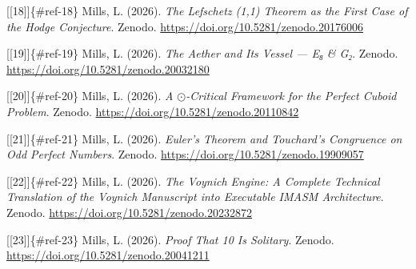 \documentclass[10pt,a4paper]{article}
\begin{document}
{[}{[}18{]}{]}\{\#ref-18\} Mills, L. (2026). \emph{The Lefschetz (1,1) Theorem as the First Case of the Hodge Conjecture}. Zenodo. \href{}{https://doi.org/10.5281/zenodo.20176006}

{[}{[}19{]}{]}\{\#ref-19\} Mills, L. (2026). \emph{The Aether and Its Vessel --- E₈ \& G₂}. Zenodo. \href{}{https://doi.org/10.5281/zenodo.20032180}

{[}{[}20{]}{]}\{\#ref-20\} Mills, L. (2026). \emph{A $\odot$-Critical Framework for the Perfect Cuboid Problem}. Zenodo. \href{}{https://doi.org/10.5281/zenodo.20110842}

{[}{[}21{]}{]}\{\#ref-21\} Mills, L. (2026). \emph{Euler's Theorem and Touchard's Congruence on Odd Perfect Numbers}. Zenodo. \href{}{https://doi.org/10.5281/zenodo.19909057}

{[}{[}22{]}{]}\{\#ref-22\} Mills, L. (2026). \emph{The Voynich Engine: A Complete Technical Translation of the Voynich Manuscript into Executable IMASM Architecture}. Zenodo. \href{}{https://doi.org/10.5281/zenodo.20232872}

{[}{[}23{]}{]}\{\#ref-23\} Mills, L. (2026). \emph{Proof That 10 Is Solitary}. Zenodo. \href{}{https://doi.org/10.5281/zenodo.20041211}
\end{document}
